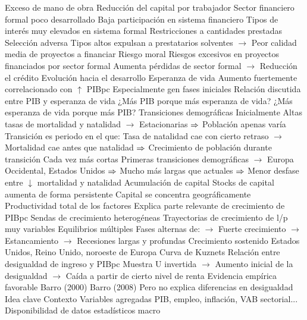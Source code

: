 \documentclass{nuevotema}
\begin{document}
\begin{esquemal}
				\4[$\then$] Exceso de mano de obra
				\4[$\then$] Reducción del capital por trabajador
			\3 Sector financiero formal poco desarrollado
				\4 Baja participación en sistema financiero
				\4 Tipos de interés muy elevados en sistema formal
				\4 Restricciones a cantidades prestadas
				\4 Selección adversa
				\4[] Tipos altos expulsan a prestatarios solventes
				\4[] $\to$ Peor calidad media de proyectos a financiar
				\4 Riesgo moral
				\4[] Riesgos excesivos en proyectos financiados por sector formal
				\4[] Aumenta pérdidas de sector formal
				\4[] $\to$ Reducción el crédito
		\2 Evolución hacia el desarrollo
			\3 Esperanza de vida
				\4 Aumento fuertemente correlacionado con $\uparrow$ PIBpc
				\4[] Especialmente gen fases iniciales
				\4 Relación discutida entre PIB y esperanza de vida
				\4[] ¿Más PIB porque más esperanza de vida?
				\4[] ¿Más esperanza de vida porque más PIB?
			\3 Transiciones demográficas
				\4 Inicialmente
				\4[] Altas tasas de mortalidad y natalidad
				\4[] $\to$ Estacionarias
				\4[] $\then$ Población apenas varía
				\4 Transición es periodo en el que:
				\4[] Tasa de natalidad cae con cierto retraso
				\4[] $\to$ Mortalidad cae antes que natalidad
				\4[] $\then$ Crecimiento de población durante transición
				\4 Cada vez más cortas
				\4[] Primeras transiciones demográficas
				\4[] $\to$ Europa Occidental, Estados Unidos
				\4[] $\then$ Mucho más largas que actuales
				\4[] $\then$ Menor desfase entre $\downarrow$ mortalidad y natalidad
			\3 Acumulación de capital
				\4 Stocks de capital aumenta de forma persistente
				\4 Capital se concentra geográficamente
			\3 Productividad total de los factores
				\4 Explica parte relevante de crecimiento de PIBpc
			\3 Sendas de crecimiento heterogéneas
				\4 Trayectorias de crecimiento de l/p muy variables
				\4 Equilibrios múltiples
				\4[] Fases alternas de:
				\4[] $\to$ Fuerte crecimiento
				\4[] $\to$ Estancamiento
				\4[] $\to$ Recesiones largas y profundas
				\4 Crecimiento sostenido
				\4[] Estados Unidos, Reino Unido, noroeste de Europa
			\3 Curva de Kuznets
				\4 Relación entre desigualdad de ingreso y PIBpc
				\4[] Muestra U invertida
				\4[] $\to$ Aumento inicial de la desigualdad
				\4[] $\to$ Caída a partir de cierto nivel de renta
				\4 Evidencia empírica favorable
				\4[] Barro (2000)
				\4[] Barro (2008)
				\4 Pero no explica diferencias en desigualdad
	\1 
		\2 Idea clave
			\3 Contexto
				\4 Variables agregadas
				\4[] PIB, empleo, inflación, VAB sectorial...
				\4 Disponibilidad de datos estadísticos macro

\end{esquemal}
\end{document}
